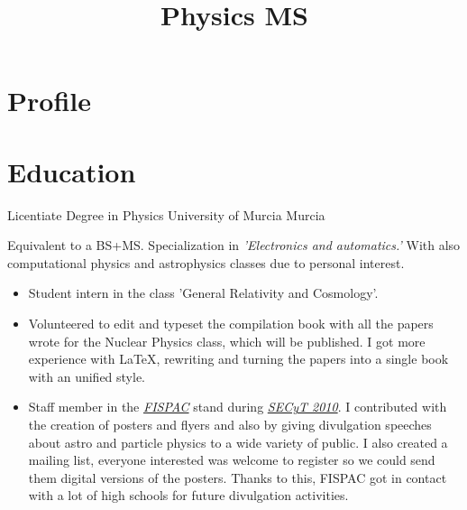 \documentclass[11pt,a4paper,roman]{moderncv}
\title{Physics MS}
\begin{document}
\maketitle



\section{Profile}

\section{Education}

	{Licentiate Degree in Physics}
	{University of Murcia}
	{Murcia}
	{}
	{Equivalent to a BS+MS. Specialization in \textit{'Electronics and automatics.'}
	 With also computational physics and astrophysics classes due to personal interest.
	\begin{itemize}
		\item Student intern in the class 'General Relativity and Cosmology'.
		\item Volunteered to edit and typeset the compilation book with all the 
		papers wrote for the Nuclear Physics class, which will be published. I got 
		more experience with \LaTeX, rewriting and turning the 
		papers into a single book with an unified style.
		\item Staff member in the \textit{\href{http://www.um.es/fispac/}
		{FISPAC}} stand during \textit{\href{http://www.f-
		seneca.org/secyt10/home.php}{SECyT 2010}}. I contributed with the creation 
		of posters and flyers and also by giving divulgation speeches about astro 
		and particle physics to a wide variety of public. I also created a mailing 
		list, everyone interested was welcome to register so we could send them 
		digital versions of the posters. Thanks to this, FISPAC got in contact with 
		a lot of high schools for future divulgation activities.
	\end{itemize}	
	}
\end{document}
